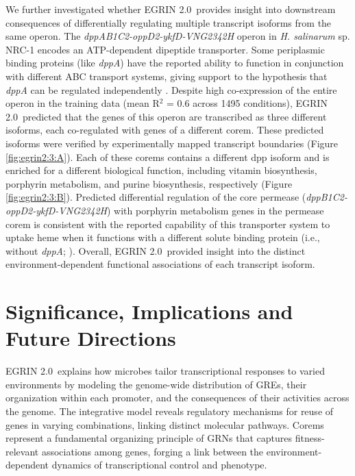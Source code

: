 \documentclass{article}
\newcommand{\tmsamp}[1]{\textsf{#1}}
\newcommand{\halo}{{\emph{H. salinarum} sp. NRC-1 }}
\newcommand{\egrine}{{\tmsamp{EGRIN 2.0}}}
\begin{document}
We further investigated whether \egrine~provides insight into downstream consequences of differentially regulating multiple transcript isoforms from the same operon. The \textit{dppAB1C2-oppD2-ykfD-VNG2342H} operon in \halo encodes an ATP-dependent dipeptide transporter. Some periplasmic binding proteins (like \textit{dppA}) have the reported ability to function in conjunction with different ABC transport systems, giving support to the hypothesis that \textit{dppA} can be regulated independently \cite{higgins_binding_1990}. Despite high co-expression of the entire operon in the training data (mean R$^{2}$ = 0.6 across 1495 conditions), \egrine~predicted that the genes of this operon are transcribed as three different isoforms, each co-regulated with genes of a different corem. These predicted isoforms were verified by experimentally mapped transcript boundaries (Figure \ref{fig:egrin2:3:A}). Each of these corems contains a different dpp isoform and is enriched for a different biological function, including vitamin biosynthesis, porphyrin metabolism, and purine biosynthesis, respectively (Figure \ref{fig:egrin2:3:B}). Predicted differential regulation of the core permease (\textit{dppB1C2-oppD2-ykfD-VNG2342H}) with porphyrin metabolism genes in the permease corem is consistent with the reported capability of this transporter system to uptake heme when it functions with a different solute binding protein (i.e., without \textit{dppA}; \cite{letoffe_housekeeping_2006}). Overall, \egrine~provided insight into the distinct environment-dependent functional associations of each transcript isoform.   

\section{Significance, Implications and Future Directions}

\egrine~explains how microbes tailor transcriptional responses to varied environments by modeling the genome-wide distribution of GREs, their organization within each promoter, and the consequences of their activities across the genome. The integrative model reveals regulatory mechanisms for reuse of genes in varying combinations, linking distinct molecular pathways. Corems represent a fundamental organizing principle of GRNs that captures fitness-relevant associations among genes, forging a link between the environment-dependent dynamics of transcriptional control and phenotype. 

\end{document}
